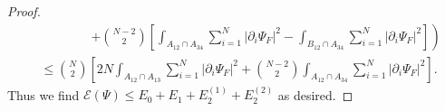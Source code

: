 \documentclass[a4paper,11pt]{article}
\newcommand{\norm}[1]{\left\lVert #1 \right\rVert}
\newcommand{\abs}[1]{\left\lvert #1 \right\rvert}
\newcommand{\R}{\mathbb{R}}
\newcommand{\rr}{\mathcal{R}}
\numberwithin{equation}{section}
\begin{document}
\begin{proof}
\begin{equation}
\begin{aligned}
		&\qquad\qquad\left.+\binom{N-2}{2}\left[\int_{A_{12}\cap A_{34}}\sum_{i=1}^{N}\abs{\partial_i\Psi_F}^2-\int_{B_{12}\cap A_{34}}\sum_{i=1}^{N}\abs{\partial_i\Psi_F}^2\right]\right)\\
		&\leq \binom{N}{2}\left[2N\int_{A_{12}\cap A_{13}}\sum_{i=1}^{N}\abs{\partial_i\Psi_F}^2+\binom{N-2}{2}\int_{A_{12}\cap A_{34}}\sum_{i=1}^{N}\abs{\partial_i\Psi_F}^2\right].
		\end{aligned}
		\end{equation}
		Thus we find $
		\mathcal{E}(\Psi)\leq E_0+E_1+E_2^{(1)}+E_2^{(2)}$ as desired.
	\end{proof}
\end{document}
